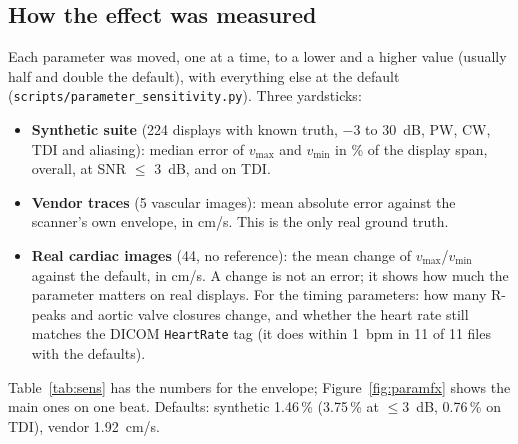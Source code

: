 \documentclass[11pt,a4paper]{article}
\newcommand{\code}[1]{\texttt{\small #1}}
\newcommand{\vmax}{v_{\max}}
\newcommand{\vmin}{v_{\min}}
\begin{document}
\subsection{How the effect was measured}
Each parameter was moved, one at a time, to a lower and a higher value (usually half and double the default), with
everything else at the default (\code{scripts/parameter\_sensitivity.py}). Three yardsticks:
\begin{itemize}
\item \textbf{Synthetic suite} (224 displays with known truth, $-3$ to 30~dB, PW, CW, TDI and aliasing): median error
of $\vmax$ and $\vmin$ in \% of the display span, overall, at SNR $\le$ 3~dB, and on TDI.
\item \textbf{Vendor traces} (5 vascular images): mean absolute error against the scanner's own envelope, in cm/s. This
is the only real ground truth.
\item \textbf{Real cardiac images} (44, no reference): the mean change of $\vmax$/$\vmin$ against the default, in cm/s.
A change is not an error; it shows how much the parameter matters on real displays. For the timing parameters: how
many R-peaks and aortic valve closures change, and whether the heart rate still matches the DICOM \code{HeartRate} tag
(it does within 1~bpm in 11 of 11 files with the defaults).
\end{itemize}
Table~\ref{tab:sens} has the numbers for the envelope; Figure~\ref{fig:paramfx} shows the main ones on one beat.
Defaults: synthetic 1.46\,\% (3.75\,\% at $\le$3~dB, 0.76\,\% on TDI), vendor 1.92~cm/s.
\end{document}
